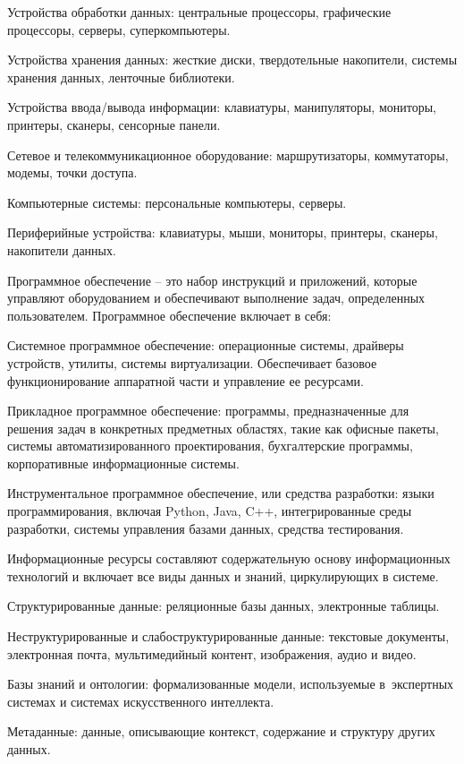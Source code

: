 \documentclass{ou}
\begin{document}
Устройства обработки данных: центральные процессоры, графические процессоры, серверы, суперкомпьютеры.

Устройства хранения данных: жесткие диски, твердотельные накопители, системы хранения данных, ленточные библиотеки.

Устройства ввода/вывода информации: клавиатуры, манипуляторы, мониторы, принтеры, сканеры, сенсорные панели.

Сетевое и телекоммуникационное оборудование: маршрутизаторы, коммутаторы, модемы, точки доступа.

Компьютерные системы: персональные компьютеры, серверы.

Периферийные устройства: клавиатуры, мыши, мониторы, принтеры, сканеры, накопители данных.

Программное обеспечение -- это набор инструкций и приложений, которые управляют оборудованием и обеспечивают выполнение задач, определенных пользователем. Программное обеспечение включает в себя:

Системное программное обеспечение: операционные системы, драйверы устройств, утилиты, системы виртуализации. Обеспечивает базовое функционирование аппаратной части и управление ее ресурсами.

Прикладное программное обеспечение: программы, предназначенные для решения задач в конкретных предметных областях, такие как офисные пакеты, системы автоматизированного проектирования, бухгалтерские программы, корпоративные информационные системы.

Инструментальное программное обеспечение, или средства разработки: языки программирования, включая Python, Java, C++, интегрированные среды разработки, системы управления базами данных, средства тестирования\cite{Computerra}. 

Информационные ресурсы составляют содержательную основу информационных технологий и включает все виды данных и знаний, циркулирующих в системе.

Структурированные данные: реляционные базы данных, электронные таблицы.

Неструктурированные и слабоструктурированные данные: текстовые документы, электронная почта, мультимедийный контент, изображения, аудио и видео.

Базы знаний и онтологии: формализованные модели, используемые в~экспертных системах и системах искусственного интеллекта.

Метаданные: данные, описывающие контекст, содержание и структуру других данных.
\end{document}
